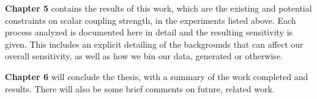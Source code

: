 \textbf{Chapter 5} contains the results of this work, which are the existing and potential constraints on scalar coupling strength, in the experiments listed above.
Each process analyzed is documented here in detail and the resulting sensitivity is given.
This includes an explicit detailing of the backgrounds that can affect our overall sensitivity, as well as how we bin our data, generated or otherwise.

\textbf{Chapter 6} will conclude the thesis, with a summary of the work completed and results.
There will also be some brief comments on future, related work.
